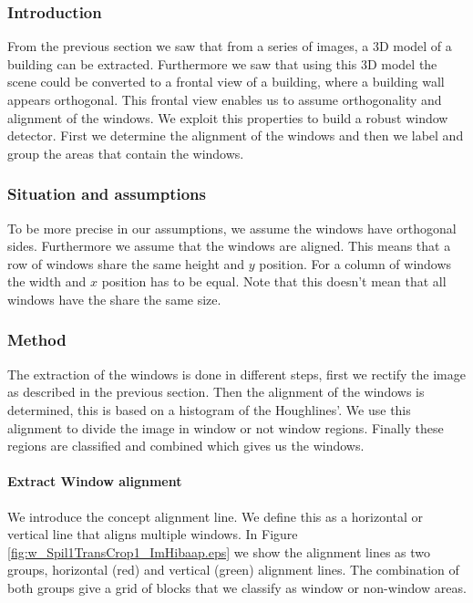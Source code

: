 \subsubsection{Introduction}
From the previous section we saw that from a series of images, a 3D model of a
building can be extracted. Furthermore we saw that using this 3D model the
scene could be converted to a frontal view of a building, where a building wall
appears orthogonal.  This frontal view enables us to assume orthogonality and
alignment of the windows. 
We exploit this properties to build a robust window detector. First we determine
the alignment of the windows and then we label and group the areas that
contain the windows. 

\subsubsection{Situation and assumptions}
To be more precise in our assumptions, we assume the windows have orthogonal
sides.  Furthermore we assume that the windows are aligned. This means that a
row of windows share the same height and $y$ position. For a column of windows
the width and $x$ position has to be equal.  Note that this doesn't mean that
all windows have the share the same size.

\subsubsection{Method}
The extraction of the windows is done in different steps, first we rectify the
image as described in the previous section.  Then the alignment of the windows
is determined, this is based on a histogram of the Houghlines'. We use this
alignment to divide the image in window or not window regions.  Finally these
regions are classified and combined which gives us the windows.



\paragraph{Extract Window alignment}
We introduce the concept alignment line. We define this as a horizontal or
vertical line that aligns multiple windows. In Figure
\ref{fig:w_Spil1TransCrop1_ImHibaap.eps}
we show the alignment lines as two groups, horizontal (red) and
vertical (green) alignment lines.  The combination of both groups give a grid of
blocks that we classify as window or non-window areas.\\


